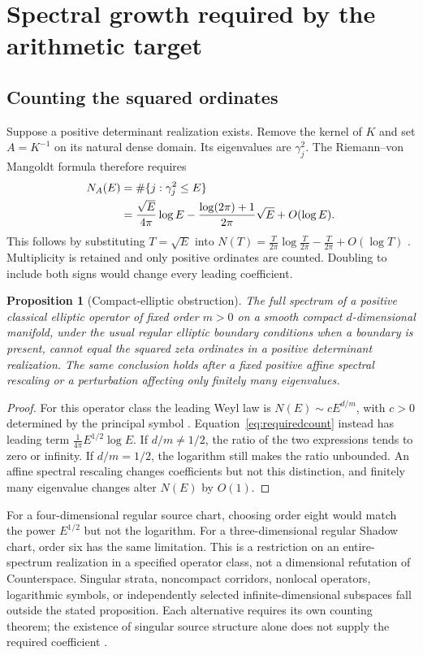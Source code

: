 \documentclass[11pt,letterpaper]{article}
\numberwithin{equation}{section}
\newtheorem{proposition}[theorem]{Proposition}
\theoremstyle{definition}
\theoremstyle{remark}
\begin{document}
\section{Spectral growth required by the arithmetic target}
\label{sec:weyl}
\subsection{Counting the squared ordinates}
Suppose a positive determinant realization exists. Remove the kernel of $K$ and set $A=K^{-1}$ on its natural dense domain. Its eigenvalues are $\gamma_j^2$. The Riemann--von Mangoldt formula therefore requires
\begin{align}
 N_A(E)&=\#\{j:\gamma_j^2\leq E\}\notag\\
 &=\frac{\sqrt E}{4\pi}\log E
   -\frac{\log(2\pi)+1}{2\pi}\sqrt E+O(\log E).
 \label{eq:requiredcount}
\end{align}
This follows by substituting $T=\sqrt E$ into
$N(T)=\frac{T}{2\pi}\log\frac{T}{2\pi}-\frac{T}{2\pi}+O(\log T)$ \cite{titchmarsh}. Multiplicity is retained and only positive ordinates are counted. Doubling to include both signs would change every leading coefficient.

\begin{proposition}[Compact-elliptic obstruction]
\label{prop:weylobstruction}
The full spectrum of a positive classical elliptic operator of fixed order $m>0$ on a smooth compact $d$-dimensional manifold, under the usual regular elliptic boundary conditions when a boundary is present, cannot equal the squared zeta ordinates in a positive determinant realization. The same conclusion holds after a fixed positive affine spectral rescaling or a perturbation affecting only finitely many eigenvalues.
\end{proposition}
\begin{proof}
For this operator class the leading Weyl law is $N(E)\sim cE^{d/m}$, with $c>0$ determined by the principal symbol \cite{hormander}. Equation~\eqref{eq:requiredcount} instead has leading term $\frac1{4\pi}E^{1/2}\log E$. If $d/m\neq1/2$, the ratio of the two expressions tends to zero or infinity. If $d/m=1/2$, the logarithm still makes the ratio unbounded. An affine spectral rescaling changes coefficients but not this distinction, and finitely many eigenvalue changes alter $N(E)$ by $O(1)$.
\end{proof}

For a four-dimensional regular source chart, choosing order eight would match the power $E^{1/2}$ but not the logarithm. For a three-dimensional regular Shadow chart, order six has the same limitation. This is a restriction on an entire-spectrum realization in a specified operator class, not a dimensional refutation of Counterspace. Singular strata, noncompact corridors, nonlocal operators, logarithmic symbols, or independently selected infinite-dimensional subspaces fall outside the stated proposition. Each alternative requires its own counting theorem; the existence of singular source structure alone does not supply the required coefficient \cite{tcgsgeometry}.
\end{document}
